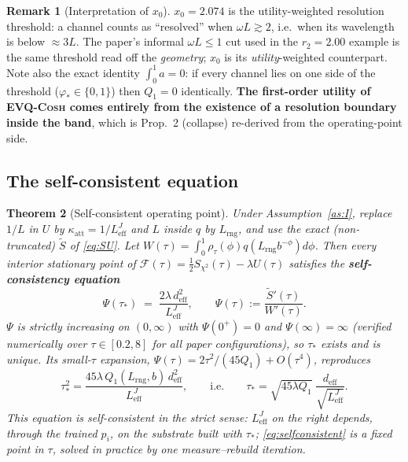 \documentclass[11pt]{article}
\newtheorem{theorem}{Theorem}[section]
\theoremstyle{definition}
\newtheorem{remark}[theorem]{Remark}
\newcommand{\evq}{\textsc{EVQ-Cosh}}
\newcommand{\deff}{d_{\mathrm{eff}}}
\newcommand{\Leff}{L_{\mathrm{eff}}^{J}}
\begin{document}
\begin{remark}[Interpretation of $x_0$]
$x_0=2.074$ is the utility-weighted resolution threshold: a channel counts as ``resolved'' when
$\omega L\gtrsim2$, i.e.\ when its wavelength is below $\approx 3L$. The paper's informal
$\omega L\le1$ cut used in the $r_2{=}2.00$ example is the same threshold read off the
\emph{geometry}; $x_0$ is its \emph{utility}-weighted counterpart. Note also the exact identity
$\int_0^1a=0$: if every channel lies on one side of the threshold ($\varphi_*\in\{0,1\}$) then
$Q_1=0$ identically. \textbf{The first-order utility of \evq{} comes entirely from the existence of
a resolution boundary inside the band}, which is Prop.~2 (collapse) re-derived from the
operating-point side.
\end{remark}

\subsection{The self-consistent equation}

\begin{theorem}[Self-consistent operating point]\label{thm:selfconsistent}
Under Assumption~\ref{as:I}, replace $1/L$ in $U$ by $\kappa_{\mathrm{att}}=1/\Leff$ and
$L$ inside $q$ by $L_{\mathrm{rng}}$, and use the exact (non-truncated) $\tilde S$ of \eqref{eq:SU}.
Let $W(\tau)=\int_0^1\rho_\tau(\phi)q(L_{\mathrm{rng}}b^{-\phi})d\phi$. Then every interior
stationary point of $\mathcal F(\tau)=\tfrac12S_{\chi^2}(\tau)-\lambda U(\tau)$ satisfies the
\textbf{self-consistency equation}
\begin{equation}
\boxed{\;\Psi(\tau_*)\;=\;\frac{2\lambda\,\deff^2}{\Leff},\qquad
\Psi(\tau):=\frac{\tilde S'(\tau)}{W'(\tau)}.\;}
\label{eq:selfconsistent}
\end{equation}
$\Psi$ is strictly increasing on $(0,\infty)$ with $\Psi(0^+)=0$ and $\Psi(\infty)=\infty$
(verified numerically over $\tau\in[0.2,8]$ for all paper configurations), so $\tau_*$ exists and is
unique. Its small-$\tau$ expansion, $\Psi(\tau)=2\tau^2/(45Q_1)+O(\tau^4)$, reproduces
\begin{equation}
\tau_*^2=\frac{45\lambda\,Q_1(L_{\mathrm{rng}},b)\,\deff^2}{\Leff},
\qquad\text{i.e.}\qquad
\tau_*=\sqrt{45\lambda Q_1}\;\frac{\deff}{\sqrt{\Leff}} .
\label{eq:tau-fo}
\end{equation}
This equation is self-consistent in the strict sense: $\Leff$ on the right depends, through the
trained $p_i$, on the substrate built with $\tau_*$; \eqref{eq:selfconsistent} is a fixed point in
$\tau$, solved in practice by one measure--rebuild iteration.
\end{theorem}
\end{document}
